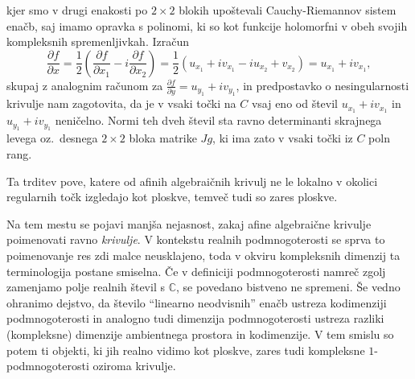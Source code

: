 \documentclass[mat1]{fmfdelo}
\numberwithin{equation}{section}
\newcommand{\R}{\mathbb R}
\newcommand{\C}{\mathbb C}
\newcommand{\pdv}[2][]{\frac{\partial#1}{\partial#2}}
\newcommand{\oz}{oz.\ }
\theoremstyle{definition}
\begin{document}
\begin{dokaz}
    \noindent kjer smo v drugi enakosti po $2 \times 2$ blokih upoštevali Cauchy-Riemannov sistem enačb, saj imamo opravka s polinomi, ki so kot funkcije holomorfni v obeh svojih kompleksnih spremenljivkah. Izračun
    \[
        \pdv[f]{x} = \frac{1}{2} \left( \pdv[f]{x_1} - i\pdv[f]{x_2}\right) = \frac{1}{2} \left( u_{x_1} + i v_{x_1} - i u_{x_2} + v_{x_2}\right) = u_{x_1} + iv_{x_1},
    \]
    skupaj z analognim računom za $\pdv[f]{y} = u_{y_1} + iv_{y_1}$, in predpostavko o nesingularnosti krivulje nam zagotovita, da je v vsaki točki na $C$ vsaj eno od števil $u_{x_1} + iv_{x_1}$ in $u_{y_1} + iv_{y_1}$ neničelno. Normi teh dveh števil sta ravno determinanti skrajnega levega \oz desnega $2\times 2$ bloka matrike $Jg$, ki ima zato v vsaki točki iz $C$ poln rang.
\end{dokaz}

Ta trditev pove, katere od afinih algebraičnih krivulj ne le lokalno v okolici regularnih točk izgledajo kot ploskve, temveč tudi so zares ploskve. 
\\
\par
Na tem mestu se pojavi manjša nejasnost, zakaj afine algebraične krivulje poimenovati ravno \emph{krivulje}. V kontekstu realnih podmnogoterosti se sprva to poimenovanje res zdi malce neusklajeno, toda v okviru kompleksnih dimenzij ta terminologija postane smiselna. Če v definiciji podmnogoterosti namreč zgolj zamenjamo polje realnih števil s $\C$, se povedano bistveno ne spremeni. Še vedno ohranimo dejstvo, da število ``linearno neodvisnih'' enačb ustreza kodimenziji podmnogoterosti in analogno tudi dimenzija podmnogoterosti ustreza razliki (kompleksne) dimenzije ambientnega prostora in kodimenzije. V tem smislu so potem ti objekti, ki jih realno vidimo kot ploskve, zares tudi kompleksne $1$-podmnogoterosti oziroma krivulje.
\end{document}
